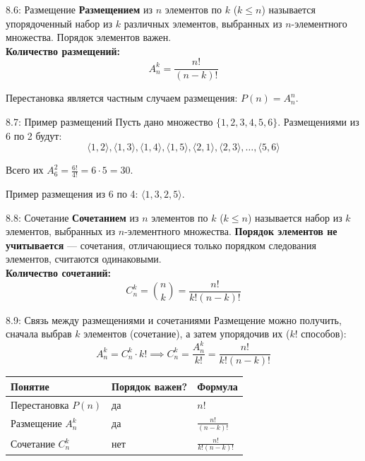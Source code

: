 \documentclass[a4paper,12pt]{article}
\begin{document}
	\begin{definitionbox}{8.6: Размещение}
		\textbf{Размещением} из $n$ элементов по $k$ ($k \le n$) называется упорядоченный набор из $k$ различных элементов, выбранных из $n$-элементного множества. Порядок элементов важен.\\
		
		\textbf{Количество размещений:}
		\[ A_n^k = \frac{n!}{(n-k)!} \]
		
		Перестановка является частным случаем размещения: $P(n) = A_n^n$.
	\end{definitionbox}
	
	\begin{examplebox}{8.7: Пример размещений}
		Пусть дано множество $\{1, 2, 3, 4, 5, 6\}$. Размещениями из 6 по 2 будут:
		\[ \langle 1,2 \rangle, \langle 1,3 \rangle, \langle 1,4 \rangle, \langle 1,5 \rangle, \langle 2,1 \rangle, \langle 2,3 \rangle, \dots, \langle 5,6 \rangle \]
		
		Всего их $A_6^2 = \frac{6!}{4!} = 6 \cdot 5 = 30$.
		
		Пример размещения из 6 по 4: $\langle 1, 3, 2, 5 \rangle$.
	\end{examplebox}
	
	\begin{definitionbox}{8.8: Сочетание}
		\textbf{Сочетанием} из $n$ элементов по $k$ ($k \le n$) называется набор из $k$ элементов, выбранных из $n$-элементного множества. \textbf{Порядок элементов не учитывается} — сочетания, отличающиеся только порядком следования элементов, считаются одинаковыми.\\
		
		\textbf{Количество сочетаний:}
		\[ C_n^k = \binom{n}{k} = \frac{n!}{k!(n-k)!} \]
	\end{definitionbox}
	
	\begin{remarkbox}{8.9: Связь между размещениями и сочетаниями}
		Размещение можно получить, сначала выбрав $k$ элементов (сочетание), а затем упорядочив их ($k!$ способов):
		\[ A_n^k = C_n^k \cdot k! \implies C_n^k = \frac{A_n^k}{k!} = \frac{n!}{k!(n-k)!} \]
	\end{remarkbox}
	
	\begin{center}
		\begin{tabular}{|l|l|l|}
			\hline
			\textbf{Понятие} & \textbf{Порядок важен?} & \textbf{Формула} \\ \hline
			Перестановка $P(n)$ & да & $n!$ \\ \hline
			Размещение $A_n^k$ & да & $\frac{n!}{(n-k)!}$ \\ \hline
			Сочетание $C_n^k$ & нет & $\frac{n!}{k!(n-k)!}$ \\ \hline
		\end{tabular}
	\end{center}
	
\end{document}
